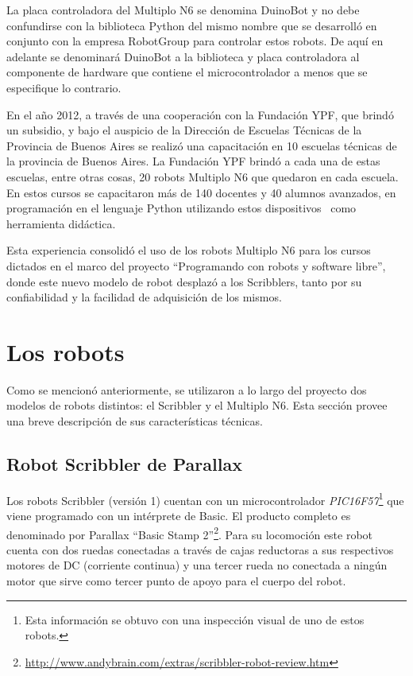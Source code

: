 La placa
controladora del Multiplo N6 se denomina DuinoBot y no debe confundirse con la biblioteca
Python del mismo nombre que se desarrolló en conjunto con la empresa RobotGroup
para controlar estos robots. De aquí en adelante se denominará DuinoBot a la
biblioteca y placa controladora al componente de hardware que contiene el
microcontrolador a menos que se especifique lo contrario.

En el año 2012, a través de una cooperación con la Fundación YPF, que brindó
un subsidio, y bajo el auspicio de la Dirección de Escuelas Técnicas de la
Provincia de Buenos Aires se realizó una
capacitación en 10 escuelas técnicas de la
provincia de Buenos Aires. La Fundación YPF brindó a cada una de estas
escuelas, entre otras
cosas, 20 robots Multiplo N6 que quedaron en cada escuela. En estos cursos
se capacitaron más de 140 docentes y 40 alumnos avanzados, en programación
en el lenguaje Python utilizando
estos dispositivos~\citep{diaz_aprendiendo_2012} como herramienta didáctica.

Esta experiencia consolidó el uso de
los robots Multiplo N6 para los cursos dictados en el marco del proyecto
``Programando con robots y software libre'',  donde este nuevo modelo de  robot desplazó
a los Scribblers, tanto por su confiabilidad y la facilidad de adquisición de los mismos.



\section{Los robots}
Como se mencionó anteriormente, se utilizaron a lo largo del proyecto dos
modelos de robots distintos: el Scribbler y el Multiplo N6. Esta sección provee una
breve descripción de sus características técnicas.

\subsection{Robot Scribbler de Parallax}
Los robots Scribbler (versión 1) cuentan con un microcontrolador
\textit{PIC16F57}\footnote{Esta información se obtuvo con una inspección
visual de uno de estos robots.}
que viene programado con un intérprete de Basic. El producto
completo es denominado por Parallax
``Basic Stamp 2''\footnote{\url{http://www.andybrain.com/extras/scribbler-robot-review.htm}}.
Para su locomoción este robot cuenta con dos ruedas conectadas a través de
cajas
reductoras
a sus respectivos motores de DC (corriente continua)  y una tercer rueda no conectada a ningún
motor que sirve como tercer punto de apoyo para el cuerpo del robot.

